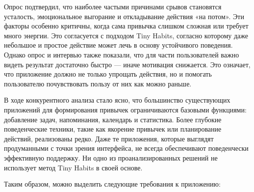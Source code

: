 \documentclass[pdflatex,sn-mathphys-num]{sn-jnl}%
\theoremstyle{thmstyleone}%
\theoremstyle{thmstyletwo}%
\theoremstyle{thmstylethree}%
\begin{document}
Опрос подтвердил, что наиболее частыми причинами срывов становятся усталость, эмоциональное выгорание и откладывание действия «на потом». Эти факторы особенно критичны, когда сама привычка слишком сложная или требует много энергии. Это согласуется с подходом Tiny Habits, согласно которому даже небольшое и простое действие может лечь в основу устойчивого поведения. Однако опрос и интервью также показали, что для части пользователей важно видеть результат достаточно быстро — иначе мотивация снижается. Это означает, что приложение должно не только упрощать действия, но и помогать пользователю почувствовать пользу от них как можно раньше.

В ходе конкурентного анализа стало ясно, что большинство существующих приложений для формирования привычек ограничиваются базовыми функциями: добавление задач, напоминания, календарь и статистика. Более глубокие поведенческие техники, такие как якорение привычек или планирование действий, реализованы редко. Даже те приложения, которые выглядят продуманными с точки зрения интерфейса, не всегда обеспечивают поведенчески эффективную поддержку. Ни одно из проанализированных решений не использует метод Tiny Habits в своей основе.

Таким образом, можно выделить следующие требования к приложению:
\end{document}
